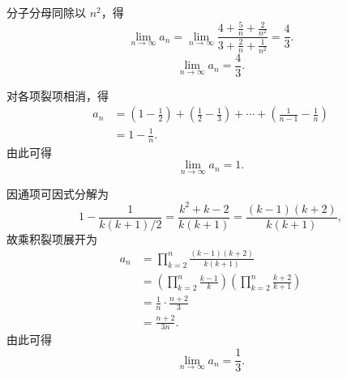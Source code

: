 \begin{solution}

    分子分母同除以 $n^2$，得
    \begin{equation}
        \lim_{n\to\infty} a_n = \lim_{n\to\infty} \frac{4 + \frac{5}{n} + \frac{2}{n^2}}{3 + \frac{2}{n} + \frac{1}{n^2}} = \frac{4}{3}.
    \end{equation}
    \begin{equation}
        \boxed{\lim_{n\to\infty} a_n = \frac{4}{3}.}
    \end{equation}


    对各项裂项相消，得
    \begin{equation}
        \begin{aligned}
            a_n & = \left( 1 - \frac{1}{2} \right) + \left( \frac{1}{2} - \frac{1}{3} \right) + \cdots + \left( \frac{1}{n-1} - \frac{1}{n} \right) \\
                & = 1 - \frac{1}{n}.
        \end{aligned}
    \end{equation}
    由此可得
    \begin{equation}
        \boxed{\lim_{n\to\infty} a_n = 1.}
    \end{equation}


    因通项可因式分解为
    \begin{equation}
        1 - \frac{1}{k(k+1)/2} = \frac{k^2 + k - 2}{k(k+1)} = \frac{(k-1)(k+2)}{k(k+1)},
    \end{equation}
    故乘积裂项展开为
    \begin{equation}
        \begin{aligned}
            a_n & = \prod_{k=2}^n \frac{(k-1)(k+2)}{k(k+1)}                                                 \\
                & = \left( \prod_{k=2}^n \frac{k-1}{k} \right) \left( \prod_{k=2}^n \frac{k+2}{k+1} \right) \\
                & = \frac{1}{n} \cdot \frac{n+2}{3}                                                         \\
                & = \frac{n+2}{3n}.
        \end{aligned}
    \end{equation}
    由此可得
    \begin{equation}
        \boxed{\lim_{n\to\infty} a_n = \frac{1}{3}.}
    \end{equation}


\end{solution}
